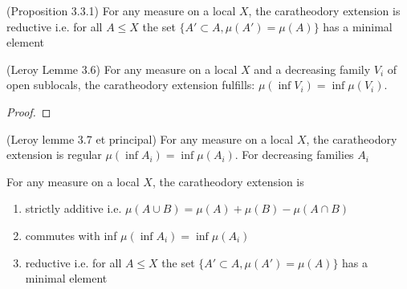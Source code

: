 \begin{proposition}[reductive]
    \label{prop:reductive}  (Proposition 3.3.1)
    For any measure on a local $X$, the caratheodory extension is
    reductive i.e. for all $A \le X$ the set $\{A' \subset A, \mu(A') = \mu(A)\}$ has a minimal element
\end{proposition}



\begin{lemma}
(Leroy Lemme 3.6)
    \label{lem:commutes_with_inf_opens}
    \leanok
    For any measure on a local $X$ and a decreasing family $V_i$ of open sublocals, the caratheodory extension fulfills: $\mu (\inf V_i) = \inf \mu(V_i)$.
\end{lemma}
\begin{proof}
    \leanok
\end{proof}

\begin{proposition}
(Leroy lemme 3.7 et principal)
    \label{prop:commutes_with_inf}
    For any measure on a local $X$, the caratheodory extension is
    regular $\mu (\inf A_i) = \inf \mu(A_i)$. For decreasing families $A_i$
\end{proposition}

\begin{theorem}
    \label{thm:main}
    For any measure on a local $X$, the caratheodory extension is
    \begin{enumerate}
        \item strictly additive i.e. $\mu (A \cup B) = \mu(A) + \mu(B) - \mu(A \cap B)$
        \item commutes with inf $\mu (\inf A_i) = \inf \mu(A_i)$
        \item reductive i.e. for all $A \le X$ the set $\{A' \subset A, \mu(A') = \mu(A)\}$ has a minimal element
    \end{enumerate}
\end{theorem}

